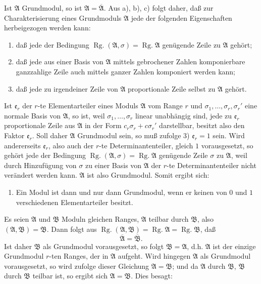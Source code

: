 \documentclass[11pt]{article}
\newcommand{\Rg}{\operatorname{Rg.}}
\begin{document}
Ist $\mathfrak A$ Grundmodul, so ist $\mathfrak A=\overline{\mathfrak A}$. Aus a), b), c) folgt daher, daß zur Charakterisierung eines Grundmoduls $\mathfrak A$ jede der folgenden Eigenschaften herbeigezogen werden kann:
\begin{enumerate}
\item[1)] daß jede der Bedingung $\Rg(\mathfrak A,\sigma)=\Rg\mathfrak A$ genügende Zeile zu $\mathfrak A$ gehört;
\item[2)] daß jede aus einer Basis von $\mathfrak A$ mittels gebrochener Zahlen komponierbare ganzzahlige Zeile auch mittels ganzer Zahlen komponiert werden kann;
\item[3)] daß jede zu irgendeiner Zeile von $\mathfrak A$ proportionale Zeile selbst zu $\mathfrak A$ gehört.
\end{enumerate}
Ist $\mathfrak e_r$ der $r$-te Elementarteiler eines Moduls $\mathfrak A$ vom Range $r$ und $\sigma_1,\ldots,\sigma_r,\sigma_r'$ eine normale Basis von $\mathfrak A$, so ist, weil $\sigma_1,\ldots,\sigma_r$ linear unabhängig sind, jede zu $\mathfrak e_r$ proportionale Zeile aus $\mathfrak A$ in der Form $c_r\sigma_r+c\sigma_r'$ darstellbar, besitzt also den Faktor $\mathfrak e_r$. Soll daher $\mathfrak A$ Grundmodul sein, so muß zufolge 3) $\mathfrak e_r=1$ sein. Wird andererseits $\mathfrak e_r$, also auch der $r$-te Determinantenteiler, gleich $1$ vorausgesetzt, so gehört jede der Bedingung $\Rg(\mathfrak A,\sigma)=\Rg\mathfrak A$ genügende Zeile $\sigma$ zu $\mathfrak A$, weil durch Hinzufügung von $\sigma$ zu einer Basis von $\mathfrak A$ der $r$-te Determinantenteiler nicht verändert werden kann. $\mathfrak A$ ist also Grundmodul. Somit ergibt sich:

\begin{enumerate}
\item[4)] Ein Modul ist dann und nur dann Grundmodul, wenn er keinen von $0$ und $1$ verschiedenen Elementarteiler besitzt.
\end{enumerate}

Es seien $\mathfrak A$ und $\mathfrak B$ Moduln gleichen Ranges, $\mathfrak A$ teilbar durch $\mathfrak B$, also $(\mathfrak A,\mathfrak B)=\mathfrak B$. Dann folgt aus $\Rg(\mathfrak A,\mathfrak B)=\Rg\mathfrak A=\Rg\mathfrak B$, daß
\[
\overline{\mathfrak A}=\overline{\mathfrak B}.
\]
Ist daher $\mathfrak B$ als Grundmodul vorausgesetzt, so folgt $\mathfrak B=\mathfrak A$, d.h. $\mathfrak A$ ist der einzige Grundmodul $r$-ten Ranges, der in $\mathfrak A$ aufgeht. Wird hingegen $\mathfrak A$ als Grundmodul vorausgesetzt, so wird zufolge dieser Gleichung $\mathfrak A=\mathfrak B$; und da $\mathfrak A$ durch $\mathfrak B$, $\mathfrak B$ durch $\mathfrak B$ teilbar ist, so ergibt sich $\mathfrak A=\mathfrak B$. Dies besagt:
\end{document}
